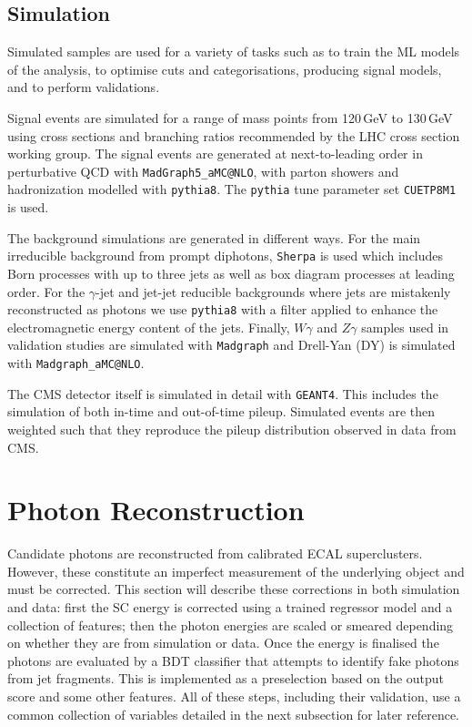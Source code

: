 \subsection{Simulation}

Simulated samples are used for a variety of tasks such as to train the ML models of the analysis, to optimise cuts and categorisations, producing signal models, and to perform validations. 

Signal events are simulated for a range of mass points from 120\,GeV to 130\,GeV using cross sections and branching ratios recommended by the LHC cross section working group. 
The signal events are generated at next-to-leading order in perturbative QCD with \texttt{MadGraph5_{}aMC@NLO}, with  parton showers and hadronization modelled with \texttt{pythia8}. The \texttt{pythia} tune parameter set \texttt{CUETP8M1} is used.

The background simulations are generated in different ways. For the main irreducible background from prompt diphotons, \texttt{Sherpa} is used which includes Born processes with up to three jets as well as box diagram processes at leading order. 
For the $\gamma$-jet and jet-jet reducible backgrounds where jets are mistakenly reconstructed as photons we use \texttt{pythia8} with a filter applied to enhance the electromagnetic energy content of the jets. 
Finally, $W\gamma$ and $Z\gamma$ samples used in validation studies are simulated with \texttt{Madgraph} and Drell-Yan (DY) is simulated with \texttt{Madgraph_{}aMC@NLO}.


The CMS detector itself is simulated in detail with \texttt{GEANT4}. 
This includes the simulation of both in-time and out-of-time pileup. 
Simulated events are then weighted such that they reproduce the pileup distribution observed in data from CMS.






\section{Photon Reconstruction}
Candidate photons are reconstructed from calibrated ECAL superclusters. However, these constitute an imperfect measurement of the underlying object and must be corrected. 
This section will describe these corrections in both simulation and data: first the SC energy is corrected using a trained regressor model and a collection of features; 
then the photon energies are scaled or smeared depending on whether they are from simulation or data. 
Once the energy is finalised the photons are evaluated by a BDT classifier that attempts to identify fake photons from jet fragments. This is implemented as a preselection based on the output score and some other features.
All of these steps, including their validation, use a common collection of variables detailed in the next subsection for later reference. 

